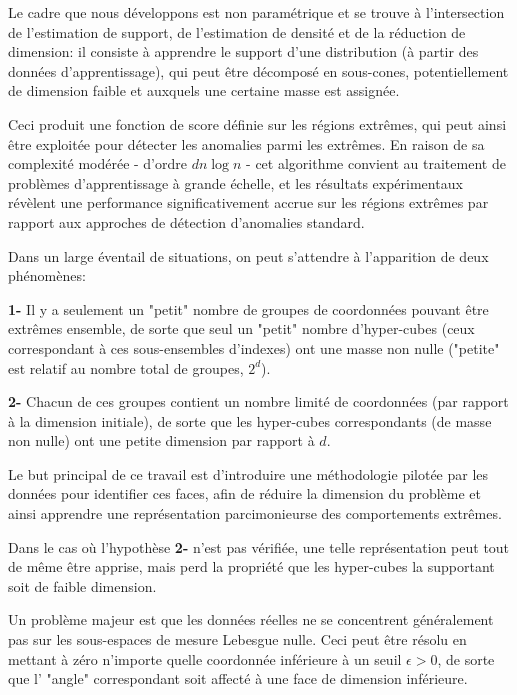 \documentclass[a4paper, 12pt]{article}
\begin{document}
Le cadre que nous développons est non paramétrique et se trouve à l'intersection de l'estimation de support, de l'estimation de densité et de la réduction de dimension: il consiste à apprendre le support d'une distribution (à partir des données d'apprentissage),  qui peut être décomposé en sous-cones, potentiellement de dimension faible et auxquels une certaine masse est assignée.%

Ceci produit une fonction de score définie sur les régions extrêmes, qui peut ainsi être exploitée pour détecter les anomalies parmi les extrêmes.
En raison de sa complexité modérée - d'ordre $ dn \log n $ - cet algorithme convient au traitement de problèmes d'apprentissage à grande échelle, et les résultats expérimentaux révèlent une performance significativement accrue sur les régions extrêmes par rapport aux approches de détection d'anomalies standard.


Dans un large éventail de situations, on peut s'attendre à l'apparition de deux phénomènes:

\textbf{1-} Il y a seulement un "petit" nombre de groupes de coordonnées pouvant être extrêmes ensemble, de sorte que seul un "petit" nombre d'hyper-cubes (ceux correspondant à ces sous-ensembles d'indexes) ont une masse non nulle ("petite" est relatif au nombre total de groupes, $2^d$).

\textbf{2-} Chacun de ces groupes contient un nombre limité de coordonnées (par rapport à la dimension initiale), de sorte que les hyper-cubes correspondants (de masse non nulle) ont une petite dimension par rapport à $ d $.

Le but principal de ce travail est d'introduire une méthodologie pilotée par les données pour identifier ces faces, afin de réduire la
dimension du problème et ainsi apprendre une représentation parcimonieurse des comportements extrêmes.

Dans le cas où l'hypothèse \textbf{2-} n'est pas vérifiée, une telle représentation peut tout de même être apprise, mais perd la propriété que les hyper-cubes la supportant soit de faible dimension.

Un problème majeur est que les données réelles ne se concentrent généralement pas sur les sous-espaces de mesure Lebesgue nulle. Ceci peut être résolu en mettant à zéro n'importe quelle coordonnée inférieure à un seuil $ \epsilon> 0 $, de sorte que l' "angle" correspondant soit affecté à une face de dimension inférieure.
\end{document}
